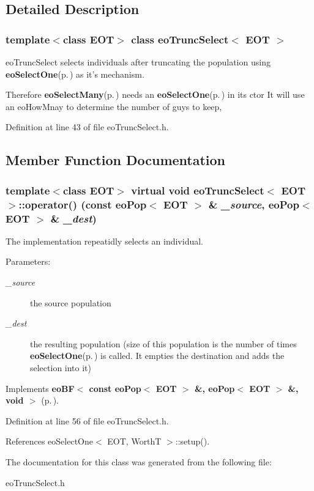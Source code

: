 \subsection{Detailed Description}
\subsubsection*{template$<$class EOT$>$ class eo\-Trunc\-Select$<$ EOT $>$}

eo\-Trunc\-Select selects individuals after truncating the population using {\bf eo\-Select\-One}{\rm (p.\,\pageref{classeo_select_one})} as it's mechanism. 

Therefore {\bf eo\-Select\-Many}{\rm (p.\,\pageref{classeo_select_many})} needs an {\bf eo\-Select\-One}{\rm (p.\,\pageref{classeo_select_one})} in its ctor It will use an eo\-How\-Mnay to determine the number of guys to keep, 



Definition at line 43 of file eo\-Trunc\-Select.h.

\subsection{Member Function Documentation}
\subsubsection{\setlength{\rightskip}{0pt plus 5cm}template$<$class EOT$>$ virtual void {\bf eo\-Trunc\-Select}$<$ {\bf EOT} $>$::operator() (const {\bf eo\-Pop}$<$ {\bf EOT} $>$ \& {\em \_\-source}, {\bf eo\-Pop}$<$ {\bf EOT} $>$ \& {\em \_\-dest})\hspace{0.3cm}{\tt  [inline, virtual]}}\label{classeo_trunc_select_a1}


The implementation repeatidly selects an individual. 

\begin{Desc}
\item[Parameters:]
\begin{description}
\item[{\em \_\-source}]the source population \item[{\em \_\-dest}]the resulting population (size of this population is the number of times {\bf eo\-Select\-One}{\rm (p.\,\pageref{classeo_select_one})} is called. It empties the destination and adds the selection into it) \end{description}
\end{Desc}


Implements {\bf eo\-BF$<$ const eo\-Pop$<$ EOT $>$ \&, eo\-Pop$<$ EOT $>$ \&, void $>$} {\rm (p.\,\pageref{classeo_b_f_a1})}.

Definition at line 56 of file eo\-Trunc\-Select.h.

References eo\-Select\-One$<$ EOT, Worth\-T $>$::setup().

The documentation for this class was generated from the following file:\begin{CompactItemize}
\item 
eo\-Trunc\-Select.h\end{CompactItemize}
